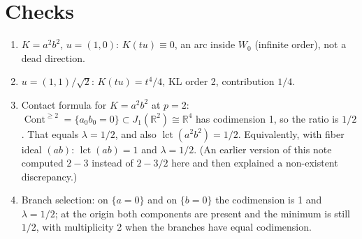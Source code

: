 \documentclass[11pt]{article}
\newcommand{\Cont}{\operatorname{Cont}}
\begin{document}
\section*{Checks}

\begin{enumerate}
\item $K = a^2 b^2$, $u = (1,0)$: $K(tu) \equiv 0$, an arc inside $W_0$ (infinite
  order), not a dead direction.
\item $u = (1,1)/\sqrt 2$: $K(tu) = t^4/4$, KL order 2, contribution $1/4$.
\item Contact formula for $K = a^2b^2$ at $p = 2$:
  $\Cont^{\geq 2} = \{a_0 b_0 = 0\} \subset J_1(\mathbb{R}^2) \cong \mathbb{R}^4$ has
  codimension 1, so the ratio is $1/2$. That equals $\lambda = 1/2$, and also
  $\operatorname{lct}(a^2b^2) = 1/2$. Equivalently, with fiber ideal $(ab)$:
  $\operatorname{lct}(ab) = 1$ and $\lambda = 1/2$. (An earlier version of this note
  computed $2 - 3$ instead of $2 - 3/2$ here and then explained a non-existent
  discrepancy.)
\item Branch selection: on $\{a = 0\}$ and on $\{b = 0\}$ the codimension is 1 and
  $\lambda = 1/2$; at the origin both components are present and the minimum is still
  $1/2$, with multiplicity 2 when the branches have equal codimension.
\end{enumerate}
\end{document}
